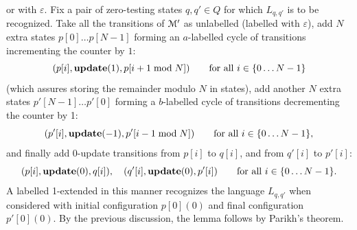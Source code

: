     or with $\varepsilon$.
    Fix a pair of zero-testing states $q,q'\in Q$ for which
    $L_{q, q'}$ is to be recognized.
    Take all the transitions of 
    $\mathcal{M}'$ as unlabelled (labelled with $\varepsilon$), 
    add $N$ extra states $p[0] \ldots p[N-1]$ forming 
    an $a$-labelled cycle of transitions incrementing the counter by
    $1$:
    \[
    (p[i], \textbf{update}(1), p[i+1  \bmod N]) \qquad \text{for all } 
    i\in\{0\ldots N-1\}
    \] 
    (which assures storing the remainder modulo $N$ in states), 
    add another $N$ extra states $p'[N-1] \ldots p'[0]$ forming 
    a $b$-labelled cycle of transitions decrementing the counter by 1:
    \[
    (p'[i], \textbf{update}(-1), p'[i-1 \bmod N]) \qquad \text{for all } 
    i\in\{0\ldots N-1\},
    \]
    and finally add 0-update transitions from
    $p[i]$ to $q[i]$, and from $q'[i]$ to $p'[i]$:
    \[
    (p[i], \textbf{update}(0), q[i]), 
    \quad 
    (q'[i], \textbf{update}(0), p'[i]) \qquad \text{for all } 
    i\in\{0\ldots N-1\}.
    \]
    A labelled 1-\cm extended in this manner recognizes
    the language $L_{q,q'}$ when considered
    with initial configuration $p[0](0)$ and final configuration $p'[0](0)$.
    By the previous discussion, the lemma follows by Parikh's theorem.
